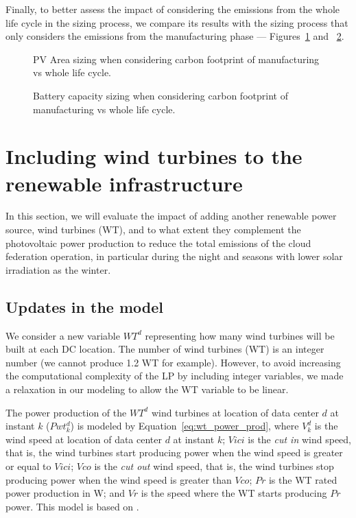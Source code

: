 Finally, to better assess the impact of considering the emissions from the whole life cycle in the sizing process, we compare its results with the sizing process that only considers the emissions from the manufacturing phase --- Figures~\ref{fig:pv_lca} and ~\ref{fig:bat_lca}.


\begin{figure}[h]
  \centering
  {}
  \caption{PV Area sizing when considering carbon footprint of manufacturing vs whole life cycle. }
  \label{fig:pv_lca}
\end{figure}


\begin{figure}[h]
  \centering
  {}
  \caption{Battery capacity sizing when considering carbon footprint of manufacturing vs whole life cycle.  }
  \label{fig:bat_lca}
\end{figure}



\section{Including wind turbines to the renewable infrastructure}
\label{sec:add_wt}
In this section, we will evaluate the impact of adding another renewable power source, wind turbines (WT), and to what extent they complement the photovoltaic power production to reduce the total emissions of the cloud federation operation, in particular during the night and seasons with lower solar irradiation as the winter.

\subsection{Updates in the model}
\label{sec:ex_model_wt}

We consider a new variable $WT^d$ representing how many wind turbines will be built at each DC location. The number of wind turbines (WT) is an integer number (we cannot produce 1.2 WT for example). However, to avoid increasing the computational complexity of the LP by including integer variables, we made a relaxation in our modeling to allow the WT variable to be linear. 

The power production of the $WT^d$ wind turbines at location of data center $d$ at instant $k$ ($Pwt^d_{k}$) is modeled by Equation~\ref{eq:wt_power_prod}, where $V^d_k$ is the wind speed at location of data center $d$ at instant $k$; $Vici$ is the \textit{cut in} wind speed, that is, the wind turbines start producing power when the wind speed is greater or equal to $Vici$; $Vco$ is the \textit{cut out} wind speed, that is, the wind turbines stop producing power when the wind speed is greater than $Vco$; $Pr$ is the WT rated power production in W; and $Vr$ is the speed where the WT starts producing $Pr$ power. This model is based on \cite{HADDAD2021100505}.


